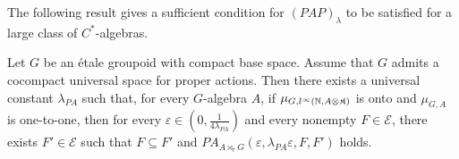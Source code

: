 
The following result gives a sufficient condition for $(PAP)_\lambda$ to be satisfied for a large class of $C^*$-algebras.

\begin{thm} \label{PAPG}
Let $G$ be an étale groupoid with compact base space. Assume that $G$ admits a cocompact universal space for proper actions. Then there exists a universal constant $\lambda_{PA}$ such that, for every $G$-algebra $A$, if $\mu_{G,l^\infty(\mathbb N, A\otimes\mathfrak K)}$ is onto and $\mu_{G,A}$ is one-to-one, then for every $\varepsilon \in(0,\frac{1}{4\lambda_{PA}})$ and every nonempty $F\in\mathcal E$, there exists $F'\in\mathcal E$ such that $F\subseteq F'$ and $PA_{A\rtimes_r G}(\varepsilon,\lambda_{PA}\varepsilon,F,F')$ holds.
\end{thm}

